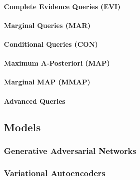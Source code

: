 			\paragraph{Complete Evidence Queries (EVI)} %

			\paragraph{Marginal Queries (MAR)} %

			\paragraph{Conditional Queries (CON)} %

			\paragraph{Maximum A-Posteriori (MAP)} %

			\paragraph{Marginal MAP (MMAP)} %

			\paragraph{Advanced Queries} %

		\subsection{Models} %

			\subsubsection{Generative Adversarial Networks} %

			\subsubsection{Variational Autoencoders} %

